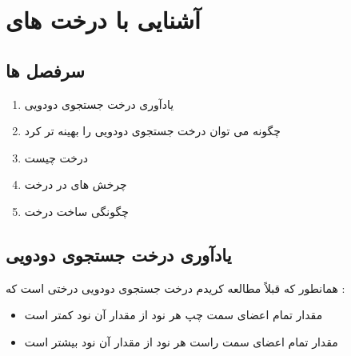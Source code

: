 \documentclass[12pt]{article}
\begin{document}
\tableofcontents

\newpage

\section{آشنایی با درخت های
}

\subsection{سرفصل ها}

\begin{enumerate}
	\item یادآوری درخت جستجوی دودویی
	\item چگونه می توان درخت جستجوی دودویی را بهینه تر کرد
	\item درخت
	چیست
	\item چرخش های در
	درخت
	\item چگونگی ساخت درخت
\end{enumerate}


\subsection{یادآوری درخت جستجوی دودویی}


\begin{latin}
\begin{center}
\end{center}
\end{latin}


همانطور که قبلاً مطالعه کریدم درخت جستجوی دودویی درختی است که : 

\begin{itemize}
	\item مقدار تمام اعضای سمت چپ هر نود از مقدار آن نود کمتر است
	\item مقدار تمام اعضای سمت راست هر نود از مقدار آن نود بیشتر است
\end{itemize}
\end{document}
